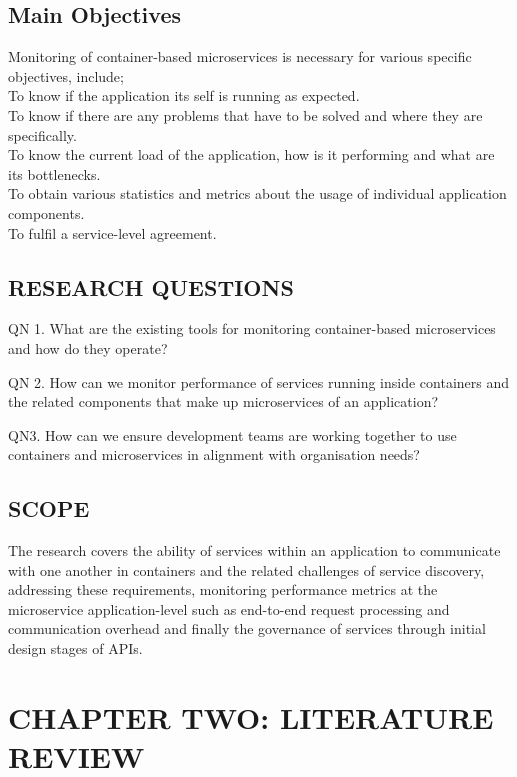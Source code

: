 \documentclass{article}
\begin{document}
\subsection{Main Objectives }

Monitoring of container-based microservices is necessary for various specific objectives, include;\\

\noindent To know if the application its self is running as expected.\\
\noindent To know if there are any problems that have to be solved and where they are specifically. \\
\noindent To know the current load of the application, how is it performing and what are its bottlenecks.\\
\noindent To obtain various statistics and metrics about the usage of individual application components.\\
\noindent To fulfil a service-level agreement.


\subsection{RESEARCH QUESTIONS }

\noindent QN 1. What are the existing tools for monitoring container-based microservices and how do they operate? 

\noindent QN 2. How can we monitor performance of services running inside containers and the related components that make up microservices of an application? 

\noindent QN3. How can we ensure development teams are working together to use containers and microservices in alignment with organisation needs?

\subsection{SCOPE }

The research covers the ability of services within an application to communicate with one another in containers and the related challenges of service discovery, addressing these requirements, monitoring performance metrics at the microservice application-level such as end-to-end request processing and communication overhead and finally the governance of services through initial design stages of APIs.

\clearpage
\section{CHAPTER TWO: LITERATURE REVIEW}
\end{document}
